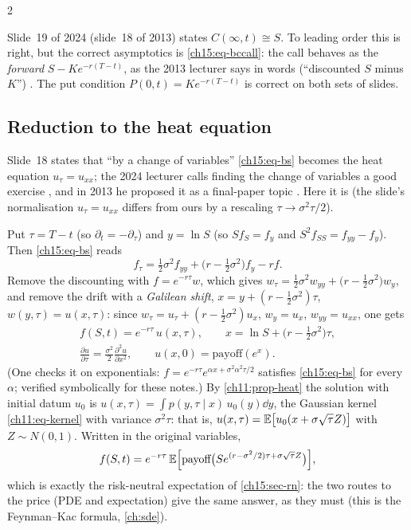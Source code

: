 \begin{paracol}{2}
\begin{coursenote}
Slide~19 of 2024 (slide~18 of 2013) states $C(\infty,t)\cong S$. To leading order this is right, but the correct asymptotics is
\eqref{ch15:eq-bccall}: the call behaves as the \emph{forward} $S-Ke^{-r(T-t)}$, as the 2013 lecturer says in words (``discounted $S$ minus $K$'') . The put condition
$P(0,t)=Ke^{-r(T-t)}$ is correct on both sets of slides.
\end{coursenote}

\subsection{Reduction to the heat equation}\label{ch15:sec-heat}
Slide~18 states that ``by a change of variables'' \eqref{ch15:eq-bs} becomes the heat equation $u_\tau=u_{xx}$; the 2024 lecturer calls finding
the change of variables a good exercise , and in 2013 he proposed it as a final-paper topic . Here it is
(the slide's normalisation $u_\tau=u_{xx}$ differs from ours by a rescaling $\tau\to\sigma^2\tau/2$).

Put $\tau=T-t$ (so $\partial_t=-\partial_\tau$) and $y=\ln S$ (so $Sf_S=f_y$ and $S^2f_{SS}=f_{yy}-f_y$). Then \eqref{ch15:eq-bs} reads
\[
  f_\tau=\tfrac12\sigma^2f_{yy}+\bigl(r-\tfrac12\sigma^2\bigr)f_y-rf .
\]
Remove the discounting with $f=e^{-r\tau}w$, which gives $w_\tau=\tfrac12\sigma^2w_{yy}+\bigl(r-\tfrac12\sigma^2\bigr)w_y$, and remove the drift with a
\emph{Galilean shift}, $x=y+(r-\tfrac12\sigma^2)\tau$, $w(y,\tau)=u(x,\tau)$: since $w_\tau=u_\tau+(r-\tfrac12\sigma^2)u_x$, $w_y=u_x$, $w_{yy}=u_{xx}$, one gets
\begin{equation}\label{ch15:eq-heat}
\begin{gathered}
  f(S,t)=e^{-r\tau}\,u(x,\tau),\qquad x=\ln S+\bigl(r-\tfrac12\sigma^2\bigr)\tau,\\
  \frac{\partial u}{\partial\tau}=\frac{\sigma^2}2\frac{\partial^2u}{\partial x^2},\qquad u(x,0)=\text{payoff}(e^x).
\end{gathered}
\end{equation}
(One checks it on exponentials: $f=e^{-r\tau}e^{\alpha x+\sigma^2\alpha^2\tau/2}$ satisfies \eqref{ch15:eq-bs} for every $\alpha$; verified symbolically for these notes.)
By \cref{ch11:prop-heat} the solution with initial datum $u_0$ is $u(x,\tau)=\int p(y,\tau\mid x)\,u_0(y)\dd y$, the Gaussian kernel \eqref{ch11:eq-kernel}
with variance $\sigma^2\tau$: that is, $u(x,\tau)=\mathbb{E}\bigl[u_0(x+\sigma\sqrt\tau Z)\bigr]$ with $Z\sim N(0,1)$. Written in the original variables,
\begin{equation}\label{ch15:eq-pde-solution}
  f(S,t)=e^{-r\tau}\,\mathbb{E}\Bigl[\text{payoff}\bigl(Se^{(r-\sigma^2/2)\tau+\sigma\sqrt\tau Z}\bigr)\Bigr],
\end{equation}
which is exactly the risk-neutral expectation of \cref{ch15:sec-rn}: the two routes to the price (PDE and expectation) give the same answer, as they must (this is the
Feynman--Kac formula, \cref{ch:sde}).


\end{paracol}

